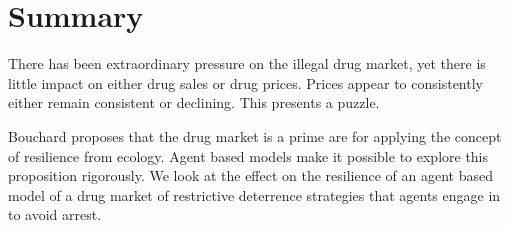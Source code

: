 \documentclass[runningheads,a4paper]{llncs}
\begin{document}

%
%


\section{Summary}

There has been extraordinary pressure on the illegal drug market, yet there is
little impact on either drug sales or drug prices. Prices appear to consistently either remain consistent or declining. This presents a puzzle. 

Bouchard proposes that the drug market is a prime are for applying the concept of resilience from ecology. Agent based models make it possible to explore this proposition rigorously. We look at the effect on the resilience of an agent based model of a drug market of restrictive deterrence strategies that agents engage in to avoid arrest.
\end{document}

